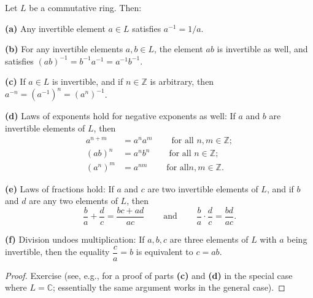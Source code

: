 \begin{proposition}
\label{prop.commring.fracs.1}
\leantarget
\leanok
Let $L$ be a commutative ring. Then:

\textbf{(a)} Any invertible element $a\in L$ satisfies $a^{-1}=1/a$.

\textbf{(b)} For any invertible elements $a,b\in L$, the element $ab$ is
invertible as well, and satisfies $\left(ab\right)^{-1}=b^{-1}%
a^{-1}=a^{-1}b^{-1}$.

\textbf{(c)} If $a\in L$ is invertible, and if $n\in\mathbb{Z}$ is arbitrary,
then $a^{-n}=\left(a^{-1}\right)^{n}=\left(a^{n}\right)^{-1}$.

\textbf{(d)} Laws of exponents hold for negative exponents as well: If $a$ and
$b$ are invertible elements of $L$, then%
\begin{align*}
a^{n+m}  &  =a^{n}a^{m}\ \ \ \ \ \ \ \ \ \ \text{for all }n,m\in\mathbb{Z};\\
\left(  ab\right)  ^{n}  &  =a^{n}b^{n}\ \ \ \ \ \ \ \ \ \ \text{for all }%
n\in\mathbb{Z};\\
\left(  a^{n}\right)  ^{m}  &  =a^{nm}\ \ \ \ \ \ \ \ \ \ \text{for all
}n,m\in\mathbb{Z}.
\end{align*}

\textbf{(e)} Laws of fractions hold: If $a$ and $c$ are two invertible
elements of $L$, and if $b$ and $d$ are any two elements of $L$, then
\[
\dfrac{b}{a}+\dfrac{d}{c}=\dfrac{bc+ad}{ac}\ \ \ \ \ \ \ \ \ \ \text{and}%
\ \ \ \ \ \ \ \ \ \ \dfrac{b}{a}\cdot\dfrac{d}{c}=\dfrac{bd}{ac}.
\]

\textbf{(f)} Division undoes multiplication: If $a,b,c$ are three elements of
$L$ with $a$ being invertible, then the equality $\dfrac{c}{a}=b$ is
equivalent to $c=ab$.
\end{proposition}

\begin{proof}
Exercise (see, e.g., \cite[solution to Exercise 4.1.1]{19s} for a proof of
parts \textbf{(c)} and \textbf{(d)} in the special case where $L=\mathbb{C}$;
essentially the same argument works in the general case).
\end{proof}

